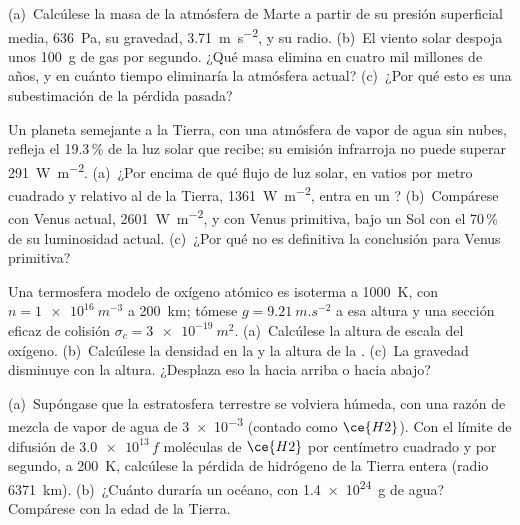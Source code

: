 \begin{exercise}[$\star\star$]\label{exo:b3:planetary-atmospheres:8}
(a)~Calcúlese la masa de la atmósfera de Marte a partir de su presión
superficial media, \qty{636}{Pa}, su gravedad, \qty{3.71}{m.s^{-2}}, y su
radio. (b)~El viento solar despoja unos \qty{100}{g} de gas por segundo.
¿Qué masa elimina en cuatro mil millones de años, y en cuánto tiempo
eliminaría la atmósfera actual? (c)~¿Por qué esto es una subestimación de la
pérdida pasada?
\end{exercise}

\begin{exercise}[$\star\star$]\label{exo:b3:planetary-atmospheres:9}
Un planeta semejante a la Tierra, con una atmósfera de vapor de agua sin nubes, refleja el 19.3\,\%
de la luz solar que recibe; su emisión infrarroja no puede superar
\qty{291}{W.m^{-2}}. (a)~¿Por encima de qué flujo de luz solar, en vatios por metro
cuadrado y relativo al de la Tierra, \qty{1361}{W.m^{-2}}, entra en un ?
(b)~Compárese con Venus actual, \qty{2601}{W.m^{-2}}, y con Venus primitiva,
bajo un Sol con el 70\,\% de su luminosidad actual. (c)~¿Por qué no es definitiva
la conclusión para Venus primitiva?
\end{exercise}

\begin{exercise}[$\star\star\star$]\label{exo:b3:planetary-atmospheres:10}
Una termosfera modelo de oxígeno atómico es isoterma a \qty{1000}{K}, con
$n = \qty{1e16}{m^{-3}}$ a \qty{200}{km}; tómese $g =
\qty{9.21}{m.s^{-2}}$ a esa altura y una sección eficaz de colisión
$\sigma_c = \qty{3e-19}{m^2}$. (a)~Calcúlese la altura de escala del oxígeno.
(b)~Calcúlese la densidad en la  y la altura de la .
(c)~La gravedad disminuye con la altura. ¿Desplaza eso la  hacia arriba o
hacia abajo?
\end{exercise}

\begin{exercise}[$\star\star\star$]\label{exo:b3:planetary-atmospheres:11}
(a)~Supóngase que la estratosfera terrestre se volviera húmeda, con una razón de
mezcla de vapor de agua de \num{3e-3} (contado como $\ce{H2}$). Con el límite
de difusión de $\num{3.0e13}\,f$ moléculas de $\ce{H2}$ por centímetro cuadrado y
por segundo, a \qty{200}{K}, calcúlese la pérdida de hidrógeno de la
Tierra entera (radio \qty{6371}{km}). (b)~¿Cuánto duraría un océano,
con \qty{1.4e24}{g} de agua? Compárese con la edad de la Tierra.
\end{exercise}

